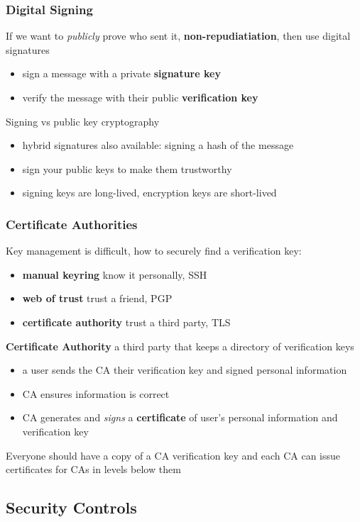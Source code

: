 \documentclass[]{article}
\theoremstyle{definition}
\begin{document}
	\subsubsection{Digital Signing}
	If we want to \textit{publicly} prove who sent it, \textbf{non-repudiatiation}, then use digital signatures
	\begin{itemize}
		\item sign a message with a private \textbf{signature key}
		\item verify the message with their public \textbf{verification key}
	\end{itemize}
	Signing vs public key cryptography
	\begin{itemize}
		\item hybrid signatures also available: signing a hash of the message
		\item sign your public keys to make them trustworthy
		\item signing keys are long-lived, encryption keys are short-lived
	\end{itemize}

	\subsubsection{Certificate Authorities}
	Key management is difficult, how to securely find a verification key:
	\begin{itemize}
		\item \textbf{manual keyring} know it personally, SSH
		\item \textbf{web of trust} trust a friend, PGP
		\item \textbf{certificate authority} trust a third party, TLS
	\end{itemize}
	\textbf{Certificate Authority} a third party that keeps a directory of verification keys
	\begin{itemize}
		\item a user sends the CA their verification key and signed personal information
		\item CA ensures information is correct
		\item CA generates and \textit{signs} a \textbf{certificate} of user's personal information and verification key
	\end{itemize}
	Everyone should have a copy of a CA verification key and each CA can issue certificates for CAs in levels below them
	

	\subsection{Security Controls}
\end{document}
